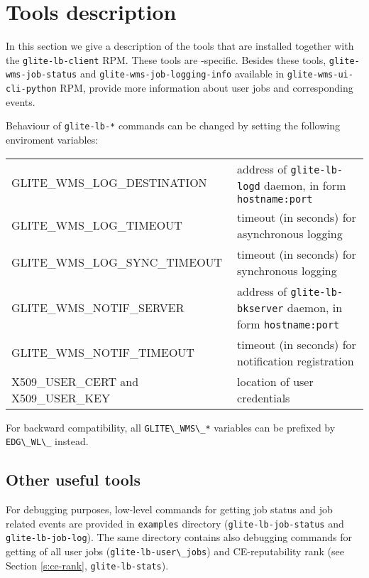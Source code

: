 \section{Tools description}
\label{s:lb-tools}

In this section we give a description of the tools that are installed
together with the \verb'glite-lb-client' RPM. These tools are \LB-specific.
Besides these tools, \verb'glite-wms-job-status' and \verb'glite-wms-job-logging-info' available 
in \verb'glite-wms-ui-cli-python' RPM, provide more information about user jobs and corresponding events.

Behaviour of \verb'glite-lb-*' commands can be changed by setting the following enviroment variables:
\begin{tabularx}{\textwidth}{lX}
GLITE\_WMS\_LOG\_DESTINATION & address of \verb'glite-lb-logd' daemon, in form \verb'hostname:port'\\
GLITE\_WMS\_LOG\_TIMEOUT & timeout (in seconds) for asynchronous logging\\
GLITE\_WMS\_LOG\_SYNC\_TIMEOUT & timeout (in seconds) for synchronous logging\\
GLITE\_WMS\_NOTIF\_SERVER& address of \verb'glite-lb-bkserver' daemon, in form \verb'hostname:port'\\
GLITE\_WMS\_NOTIF\_TIMEOUT& timeout (in seconds) for notification registration\\
X509\_USER\_CERT and X509\_USER\_KEY & location of user credentials\\
\end{tabularx}
For backward compatibility, all \verb'GLITE\_WMS\_*' variables can be prefixed by \verb'EDG\_WL\_' instead.





\subsection{Other useful tools}
\label{glite-lb-other}

For debugging purposes, low-level commands for getting \LB job status and job related events are provided in 
\verb'examples' directory (\verb'glite-lb-job-status' and \verb'glite-lb-job-log'). The same directory
contains also debugging commands for getting of all user jobs (\verb'glite-lb-user\_jobs') and
CE-reputability rank (see Section \ref{s:ce-rank}, \verb'glite-lb-stats').
